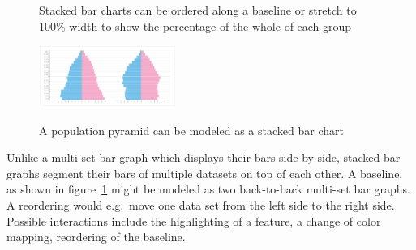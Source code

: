 \begin{figure}
  \centering
    \qquad
    \caption{Stacked bar charts can be ordered along a baseline or stretch to 100\% width to show the percentage-of-the-whole of each group}%
    \label{fig:concept:chart-types:stacked-bar-chart}
\end{figure}
\begin{figure}
  \centering
    \includegraphics[width=0.4\textwidth]{images/chartTypes/population-pyramid.png}%
    \label{fig:concept:chart-types:population-pyramid}
    \caption{A population pyramid can be modeled as a stacked bar chart}%
\end{figure}

Unlike a multi-set bar graph which displays their bars side-by-side, stacked bar graphs segment their bars of multiple datasets on top of each other.
A baseline, as shown in figure~\ref{fig:concept:chart-types:stacked-bar-chart} might be modeled as two back-to-back multi-set bar graphs. A reordering would e.g.\ move one data set from the left side to the right side.
Possible interactions include the highlighting of a feature, a change of color mapping, reordering of the baseline.

